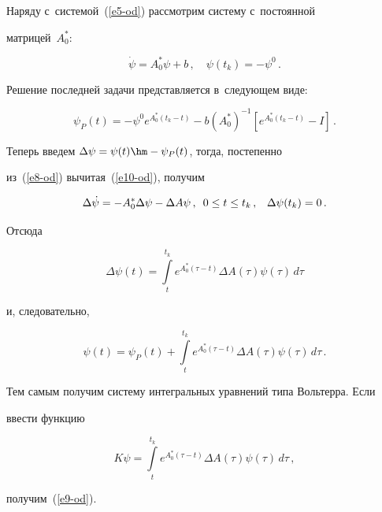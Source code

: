 Наряду с~системой~(\ref{e5-od}) рассмотрим систему с~постоянной 


матрицей~$A_0^*$:


\begin{equation}


\dot{\psi}=A_0^*\psi+b\,,\quad \psi(t_k)=-\psi^0\,.


\label{e10-od}


\end{equation}


Решение последней задачи представляется в~следующем виде:


$$


\psi_P(t)=-\psi^0 e^{A_0^*(t_k-t)} -b\left( A_0^*\right)^{-1} \left[  


e^{A_0^*(t_k-t)}-I\right]\,.


$$


Теперь введем $\Delta \psi =\psi(t)\hm- \psi_P(t)$, тогда, постепенно 


из~(\ref{e8-od}) вычитая~(\ref{e10-od}), получим 


$$


\Delta\dot{\psi} =-A_0^*\Delta\psi-\Delta A\psi\,,\enskip 0\leq t\leq t_k\,,\ \enskip


\Delta \psi(t_k)=0\,.


$$


 Отсюда


$$


\Delta\psi(t)=\int\limits_t^{t_k} e^{A_0^*(\tau-t)}\Delta A(\tau) \psi(\tau)\,d\tau


$$


и, следовательно,


\begin{equation*}


\psi(t)= \psi_P(t)+\int\limits_t^{t_k} e^{A_0^*(\tau-t)} \Delta A(\tau) \psi(\tau)\,d\tau\,.




\end{equation*}


Тем самым получим систему интегральных уравнений типа Вольтерра. Если 


ввести функцию 


$$


K\psi= \int\limits_t^{t_k} e^{A_0^*(\tau-t)} \Delta A(\tau) 


\psi(\tau)\, d\tau\,,


$$


 получим~(\ref{e9-od}).





